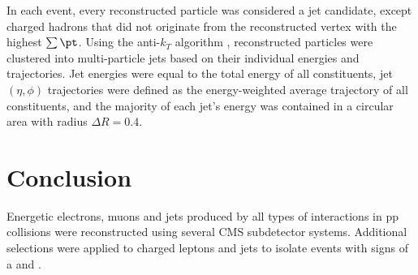 In each event, every reconstructed particle was considered a jet candidate, except charged 
hadrons that did not originate from the reconstructed vertex with the highest $\sum \pt$.  Using the 
anti-$k_{T}$ algorithm \cite{antikt}, reconstructed particles were clustered into multi-particle jets 
based on their individual energies and trajectories.  Jet energies were equal to the total energy of 
all constituents, jet $(\eta, \phi)$ trajectories were defined as the energy-weighted average trajectory 
of all constituents, and the majority of each jet's energy was contained in a circular area with radius 
$\Delta R = 0.4$.


\section{Conclusion}
\label{sec:recoConclusion}
Energetic electrons, muons and jets produced by all types of interactions in pp collisions were 
reconstructed using several CMS subdetector systems.  Additional selections were applied to charged leptons 
and jets to isolate events with signs of a \WR and \nul.

